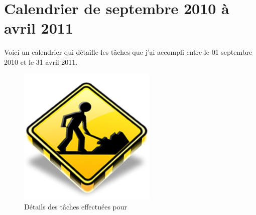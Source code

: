 \chapter{Calendrier de septembre 2010 à avril 2011}
Voici un calendrier qui détaille les tâches que j'ai accompli entre le 01 septembre 2010 et le 31 avril 2011.

\begin{figure}[h!]
	\begin{center}
		\includegraphics[scale=1]{Contenu/Annexes/Images/Calendrier_SeptembreAvril.png}
	\end{center}

	\caption{Détails des tâches effectuées pour \solulog}
	\label{calendrier_septembreavril}
\end{figure}
